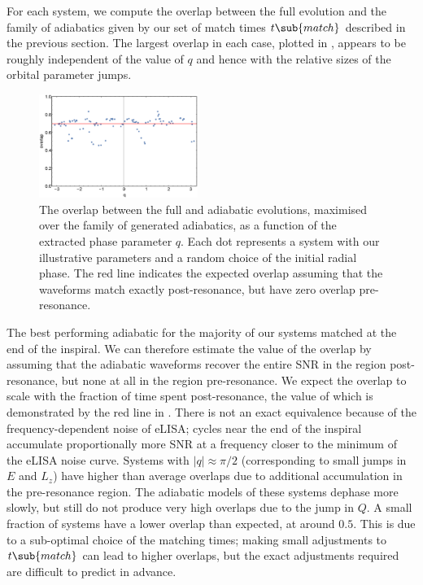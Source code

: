 For each system, we compute the overlap between the full evolution and the family of adiabatics given by our set of match times $t\sub{match}$ described in the previous section. The largest overlap in each case, plotted in , appears to be roughly independent of the value of $q$ and hence with the relative sizes of the orbital parameter jumps.
\begin{figure}
\centering
\includegraphics[width=0.46\textwidth]{overlap_vs_q}
\caption{\label{fig:overlap-vs-q}The overlap between the full and adiabatic evolutions, maximised over the family of generated adiabatics, as a function of the extracted phase parameter $q$. Each dot represents a system with our illustrative parameters and a random choice of the initial radial phase. The red line indicates the expected overlap assuming that the waveforms match exactly post-resonance, but have zero overlap pre-resonance.}
\end{figure}
The best performing adiabatic for the majority of our systems matched at the end of the inspiral. We can therefore estimate the value of the overlap by assuming that the adiabatic waveforms recover the entire SNR in the region post-resonance, but none at all in the region pre-resonance. We expect the overlap to scale with the fraction of time spent post-resonance, the value of which is demonstrated by the red line in . There is not an exact equivalence because of the frequency-dependent noise of eLISA; cycles near the end of the inspiral accumulate proportionally more SNR at a frequency closer to the minimum of the eLISA noise curve.
Systems with $|q| \approx \pi/2$ (corresponding to small jumps in $E$ and $L_z$) have higher than average overlaps due to additional accumulation in the pre-resonance region. The adiabatic models of these systems dephase more slowly, but still do not produce very high overlaps due to the jump in $Q$. A small fraction of systems have a lower overlap than expected, at around $0.5$. This is due to a sub-optimal choice of the matching times; making small adjustments to $t\sub{match}$ can lead to higher overlaps, but the exact adjustments required are difficult to predict in advance.
